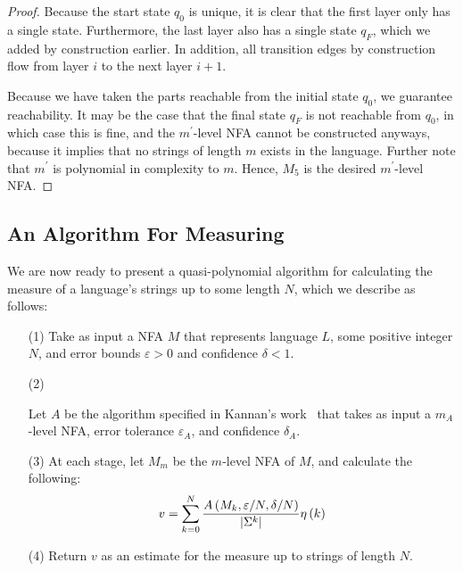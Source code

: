 \documentclass[12pt]{article}
\begin{document}
\begin{proof}
  Because the start state \(q_0\) is unique, it is clear that
  the first layer only has a single state.
  Furthermore, the last layer also has a single state \(q_F\), which
  we added by construction earlier.
  In addition, all transition edges by construction flow from
  layer \(i\) to the next layer \(i + 1\).

  Because we have taken the parts reachable from the initial state \(q_0\),
  we guarantee reachability.
  It may be the case that the final state \(q_F\) is not reachable from
  \(q_0\), in which case this is fine,
  and the \(m^\prime\)-level NFA cannot be constructed anyways,
  because it implies that no strings of length \(m\) exists in
  the language.
  Further note that \(m^\prime\) is polynomial in complexity to \(m\).
  Hence, \(M_5\) is the desired \(m^\prime\)-level NFA.

\end{proof}


\subsection{An Algorithm For Measuring}

We are now ready to present a
quasi-polynomial algorithm for calculating the
measure of a language's strings up to some length \(N\),
which we describe as follows:

\begin{enumerate}
  \item[(1)]
    Take as input a NFA \(M\) that represents language \(L\),
    some positive integer \(N\), and error bounds \(\varepsilon > 0\)
    and confidence \(\delta < 1\).

  \item[(2)]

    Let \(A\) be the algorithm specified in
    Kannan's work~\cite{acmsiam-kannan1995counting}
    that takes as input a \(m_A\)-level NFA,
    error tolerance \(\varepsilon_A\),
    and confidence \(\delta_A\).

  \item[(3)]
    At each stage, let \(M_m\) be the \(m\)-level NFA of \(M\), and
    calculate the following:
    \begin{align*}
      v =
      \sum_{k = 0}^{N}
        \frac{A\left(M_k, \varepsilon / N, \delta / N\right)}{\left\lvert\Sigma^k\right\rvert}
          \eta \left(k\right)
    \end{align*}

  \item[(4)]
    Return \(v\) as an estimate for the measure up to
    strings of length \(N\).
\end{enumerate}
\end{document}

